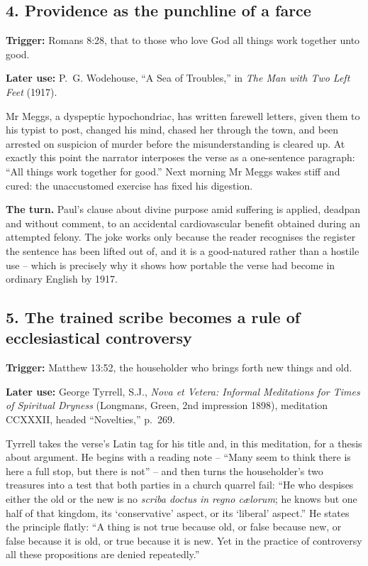 \subsection*{4. Providence as the punchline of a farce}

\textbf{Trigger:} Romans 8:28, that to those who love God all things work together unto good.\par\noindent
\textbf{Later use:} P.~G. Wodehouse, ``A Sea of Troubles,'' in \emph{The Man with Two Left Feet} (1917).

Mr Meggs, a dyspeptic hypochondriac, has written farewell letters, given them to his typist to post, changed his mind, chased her through the town, and been arrested on suspicion of murder before the misunderstanding is cleared up. At exactly this point the narrator interposes the verse as a one-sentence paragraph: ``All things work together for good.'' Next morning Mr Meggs wakes stiff and cured: the unaccustomed exercise has fixed his digestion.

\textbf{The turn.} Paul's clause about divine purpose amid suffering is applied, deadpan and without comment, to an accidental cardiovascular benefit obtained during an attempted felony. The joke works only because the reader recognises the register the sentence has been lifted out of, and it is a good-natured rather than a hostile use -- which is precisely why it shows how portable the verse had become in ordinary English by 1917.

\subsection*{5. The trained scribe becomes a rule of ecclesiastical controversy}

\textbf{Trigger:} Matthew 13:52, the householder who brings forth new things and old.\par\noindent
\textbf{Later use:} George Tyrrell, S.J., \emph{Nova et Vetera: Informal Meditations for Times of Spiritual Dryness} (Longmans, Green, 2nd impression 1898), meditation CCXXXII, headed ``Novelties,'' p.~269.

Tyrrell takes the verse's Latin tag for his title and, in this meditation, for a thesis about argument. He begins with a reading note -- ``Many seem to think there is here a full stop, but there is not'' -- and then turns the householder's two treasures into a test that both parties in a church quarrel fail: ``He who despises either the old or the new is no \emph{scriba doctus in regno c\ae lorum}; he knows but one half of that kingdom, its `conservative' aspect, or its `liberal' aspect.'' He states the principle flatly: ``A thing is not true because old, or false because new, or false because it is old, or true because it is new. Yet in the practice of controversy all these propositions are denied repeatedly.''

